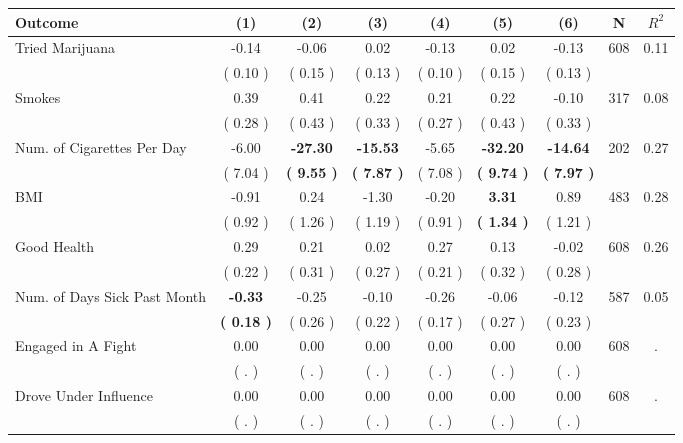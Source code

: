 \begin{tabular}{lcccccccc}
\toprule
 \textbf{Outcome} & \textbf{(1)} & \textbf{(2)} & \textbf{(3)} & \textbf{(4)} & \textbf{(5)} & \textbf{(6)} & \textbf{N} & \textbf{$ R^2$} \\
\midrule
Tried Marijuana &     -0.14 &     -0.06 &      0.02 &     -0.13 &      0.02 &     -0.13 & 608 &       0.11 \\ 
 & (     0.10 ) & (     0.15 ) & (     0.13 ) & (     0.10 ) & (     0.15 ) & (     0.13 ) & \\
Smokes &      0.39 &      0.41 &      0.22 &      0.21 &      0.22 &     -0.10 & 317 &       0.08 \\ 
 & (     0.28 ) & (     0.43 ) & (     0.33 ) & (     0.27 ) & (     0.43 ) & (     0.33 ) & \\
Num. of Cigarettes Per Day &     -6.00 & \textbf{   -27.30} & \textbf{   -15.53} &     -5.65 & \textbf{   -32.20} & \textbf{   -14.64} & 202 &       0.27 \\ 
 & (     7.04 ) & \textbf{(     9.55 )} & \textbf{(     7.87 )} & (     7.08 ) & \textbf{(     9.74 )} & \textbf{(     7.97 )} & \\
BMI &     -0.91 &      0.24 &     -1.30 &     -0.20 & \textbf{     3.31} &      0.89 & 483 &       0.28 \\ 
 & (     0.92 ) & (     1.26 ) & (     1.19 ) & (     0.91 ) & \textbf{(     1.34 )} & (     1.21 ) & \\
Good Health &      0.29 &      0.21 &      0.02 &      0.27 &      0.13 &     -0.02 & 608 &       0.26 \\ 
 & (     0.22 ) & (     0.31 ) & (     0.27 ) & (     0.21 ) & (     0.32 ) & (     0.28 ) & \\
Num. of Days Sick Past Month & \textbf{    -0.33} &     -0.25 &     -0.10 &     -0.26 &     -0.06 &     -0.12 & 587 &       0.05 \\ 
 & \textbf{(     0.18 )} & (     0.26 ) & (     0.22 ) & (     0.17 ) & (     0.27 ) & (     0.23 ) & \\
Engaged in A Fight &      0.00 &      0.00 &      0.00 &      0.00 &      0.00 &      0.00 & 608 &          . \\ 
 & (        . ) & (        . ) & (        . ) & (        . ) & (        . ) & (        . ) & \\
Drove Under Influence &      0.00 &      0.00 &      0.00 &      0.00 &      0.00 &      0.00 & 608 &          . \\ 
 & (        . ) & (        . ) & (        . ) & (        . ) & (        . ) & (        . ) & \\

\end{tabular}
